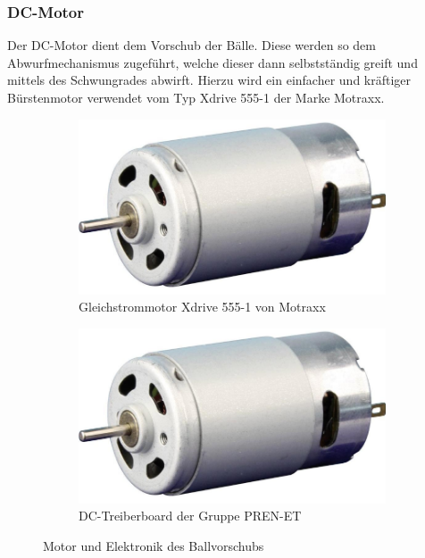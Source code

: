 \subsubsection{DC-Motor}
Der DC-Motor dient dem Vorschub der Bälle. Diese werden so dem
Abwurfmechanismus zugeführt, welche dieser dann selbstständig
greift und mittels des Schwungrades abwirft. Hierzu wird ein
einfacher und kräftiger Bürstenmotor verwendet vom Typ Xdrive
555-1 der Marke Motraxx.

\begin{figure}[h!]
	\centering
	\begin{subfigure}[b]{0.45\textwidth}
		\centering
		\includegraphics[width=1\textwidth]{../../fig/et/dc_01.png}
		\caption{Gleichstrommotor Xdrive 555-1 von Motraxx}
	\end{subfigure}
	\begin{subfigure}[b]{0.45\textwidth}
		\centering
		\includegraphics[width=1\textwidth]{../../fig/et/dc_01.png}
		\caption{DC-Treiberboard der Gruppe PREN-ET}
	\end{subfigure}
	\caption{Motor und Elektronik des Ballvorschubs}
\end{figure}

